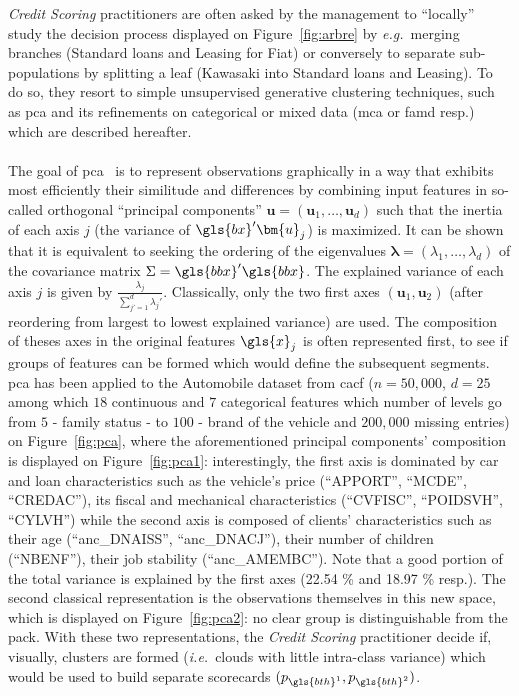 \textit{Credit Scoring} practitioners are often asked by the management to ``locally'' study the decision process displayed on Figure~\ref{fig:arbre} by \textit{e.g.}\ merging branches (Standard loans and Leasing for Fiat) or conversely to separate sub-populations by splitting a leaf (Kawasaki into Standard loans and Leasing). To do so, they resort to simple unsupervised generative clustering techniques, such as \gls{pca} and its refinements on categorical or mixed data (\gls{mca} or \gls{famd} resp.) which are described hereafter.

\paragraph{}

The goal of \gls{pca}~\cite{pages2014multiple} is to represent observations graphically in a way that exhibits most efficiently their similitude and differences by combining input features in so-called orthogonal ``principal components'' $\bm{u} = (\bm{u}_1,\dots,\bm{u}_d)$ such that the inertia of each axis $j$ (the variance of $\gls{bx}' \bm{u}_j$) is maximized. It can be shown that it is equivalent to seeking the ordering of the eigenvalues $\bm{\lambda} = (\lambda_1,\dots,\lambda_d)$ of the covariance matrix $\Sigma = \gls{bbx}'\gls{bbx}$. The explained variance of each axis $j$ is given by $\frac{\lambda_j}{\sum_{j'=1}^d \lambda_j'}$. Classically, only the two first axes $(\bm{u}_1,\bm{u}_2)$ (after reordering from largest to lowest explained variance) are used. The composition of theses axes in the original features $\gls{x}_j$ is often represented first, to see if groups of features can be formed which would define the subsequent segments. \gls{pca} has been applied to the Automobile dataset from \gls{cacf} ($n = 50{,}000$, $d = 25$ among which $18$ continuous and $7$ categorical features which number of levels go from $5$ - family status - to $100$ - brand of the vehicle and $200{,}000$ missing entries) on Figure~\ref{fig:pca}, where the aforementioned principal components' composition is displayed on Figure~\ref{fig:pca1}: interestingly, the first axis is dominated by car and loan characteristics such as the vehicle's price (``APPORT'', ``MCDE'', ``CREDAC''), its fiscal and mechanical characteristics (``CVFISC'', ``POIDSVH'', ``CYLVH'') while the second axis is composed of clients' characteristics such as their age (``anc\_DNAISS'', ``anc\_DNACJ''), their number of children (``NBENF''), their job stability (``anc\_AMEMBC''). Note that a good portion of the total variance is explained by the first axes (22.54 \% and 18.97 \% resp.). The second classical representation is the observations themselves in this new space, which is displayed on Figure~\ref{fig:pca2}: no clear group is distinguishable from the pack. With these two representations, the \textit{Credit Scoring} practitioner decide if, visually, clusters are formed (\textit{i.e.}\ clouds with little intra-class variance) which would be used to build separate scorecards $(p_{\gls{bth}^{1}},p_{\gls{bth}^{2}})$.

